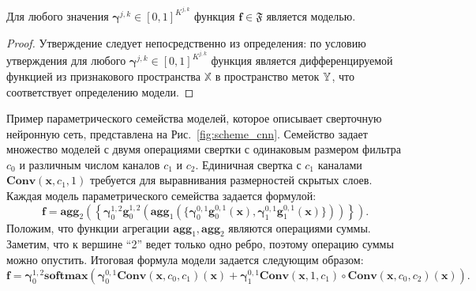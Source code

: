 \begin{utv}
Для любого значения $\boldsymbol{\gamma}^{j,k} \in [0,1]^{K^{j,k}}$ функция $\mathbf{f} \in \mathfrak{F}$ является моделью.
\end{utv}
\begin{proof}
Утверждение следует непосредственно из определения: по условию утверждения для любого $\boldsymbol{\gamma}^{j,k} \in [0,1]^{K^{j,k}}$ функция является дифференцируемой функцией из признакового пространства $\mathbb{X}$ в пространство меток $\mathbb{Y}$, что соответствует определению модели.
\end{proof}



Пример параметрического семейства моделей, которое описывает сверточную нейронную сеть, представлена на Рис.~\ref{fig:scheme_cnn}. Семейство задает множество моделей с двумя операциями свертки с одинаковым размером фильтра $c_0$ и различным числом каналов $c_1$ и $c_2$. Единичная свертка с $c_1$ каналами $\textbf{Conv}(\mathbf{x}, c_1, 1)$ требуется для выравнивания размерностей скрытых слоев. Каждая модель параметрического семейства задается формулой: 
\[
    \mathbf{f} = \textbf{agg}_2\left(\left\{\boldsymbol{\gamma}^{1,2}_0 \mathbf{g}^{1,2}_0 \left(\textbf{agg}_1 \left(\{\boldsymbol{\gamma}^{0,1}_0 \mathbf{g}^{0,1}_0(\mathbf{x}), \boldsymbol{\gamma}^{0,1}_1 \mathbf{g}^{0,1}_1(\mathbf{x})  \} \right)\right)\right\}\right).
\]
Положим, что функции агрегации $ \textbf{agg}_1,  \textbf{agg}_2$ являются операциями суммы. Заметим, что к вершине ``2'' ведет только одно ребро, поэтому операцию суммы можно опустить. 
Итоговая формула модели задается следующим образом:
\[
    \mathbf{f} = \boldsymbol{\gamma}^{1,2}_0 \textbf{softmax} \left(\boldsymbol{\gamma}^{0,1}_0 \textbf{Conv}(\mathbf{x}, c_0, c_1)(\mathbf{x}) + \boldsymbol{\gamma}^{0,1}_1 \textbf{Conv}(\mathbf{x}, 1, c_1) \circ \textbf{Conv}(\mathbf{x}, c_0, c_2)(\mathbf{x}) \right).
\]



